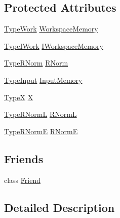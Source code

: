 \subsection*{Protected Attributes}
\begin{DoxyCompactItemize}
\item 
\hyperlink{classnmr_l_sq_lin_solution_fixed_size_a2804f3b3815a82a0f9655bcd2f86e7e4}{Type\+Work} \hyperlink{classnmr_l_sq_lin_solution_fixed_size_a3718294e665cb353e17c58bae35e91ef}{Workspace\+Memory}
\item 
\hyperlink{classnmr_l_sq_lin_solution_fixed_size_a1838601b0a3e6fa7972e8854b888152a}{Type\+I\+Work} \hyperlink{classnmr_l_sq_lin_solution_fixed_size_a679c28e537d3e2c4d0be4592715715eb}{I\+Workspace\+Memory}
\item 
\hyperlink{classnmr_l_sq_lin_solution_fixed_size_a384dc1235386018c6edbdc782c5f84be}{Type\+R\+Norm} \hyperlink{classnmr_l_sq_lin_solution_fixed_size_ab8968759e536db86f658fe569aec7c4c}{R\+Norm}
\item 
\hyperlink{classnmr_l_sq_lin_solution_fixed_size_adf9a982c0414dafb9fb1164b8da4f96f}{Type\+Input} \hyperlink{classnmr_l_sq_lin_solution_fixed_size_aabb06ec545a84d0e6cf73353c88d7bba}{Input\+Memory}
\item 
\hyperlink{classnmr_l_sq_lin_solution_fixed_size_aa00d3b54073dac6aba6e3793d4f88348}{Type\+X} \hyperlink{classnmr_l_sq_lin_solution_fixed_size_ae6be321dc3efeb73c08a9b66ca650c59}{X}
\item 
\hyperlink{classnmr_l_sq_lin_solution_fixed_size_a61e14c469c463bc06a411061aad13b3a}{Type\+R\+Norm\+L} \hyperlink{classnmr_l_sq_lin_solution_fixed_size_ae7fc2b92147410b773caab779fefcb66}{R\+Norm\+L}
\item 
\hyperlink{classnmr_l_sq_lin_solution_fixed_size_a8d12c1d86e766d8b7782e39f38b90073}{Type\+R\+Norm\+E} \hyperlink{classnmr_l_sq_lin_solution_fixed_size_a7db2609534904651db0df467d94c13ad}{R\+Norm\+E}
\end{DoxyCompactItemize}
\subsection*{Friends}
\begin{DoxyCompactItemize}
\item 
class \hyperlink{classnmr_l_sq_lin_solution_fixed_size_a7f8321d57e81bc613d5dbef3410ba70e}{Friend}
\end{DoxyCompactItemize}


\subsection{Detailed Description}
